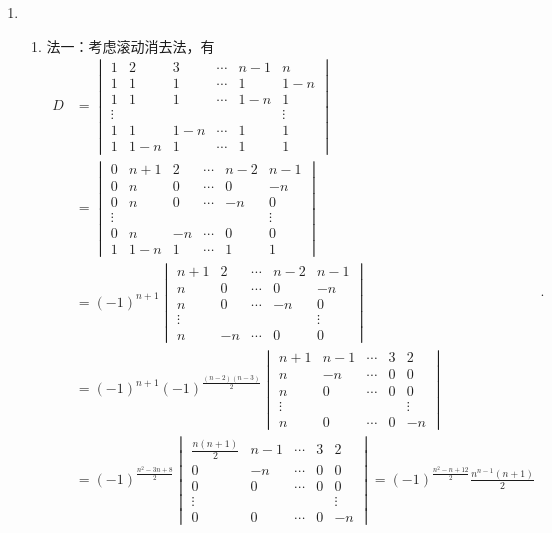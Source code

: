 \begin{enumerate}
\begin{enumerate}
        \item \begin{enumerate}
            \item 法一：考虑滚动消去法，有
            \[\begin{aligned}
            D&=\begin{vmatrix}
            1 & 2 & 3 &\cdots & n-1 & n \\
            1 & 1 & 1 &\cdots & 1 & 1-n \\
            1 & 1 & 1 &\cdots & 1-n & 1 \\
            \vdots & & & & & \vdots \\
            1 & 1 & 1-n &\cdots & 1 & 1\\
            1 & 1-n & 1 &\cdots & 1 & 1
            \end{vmatrix}\\&=\begin{vmatrix}
            0 & n+1 & 2 &\cdots & n-2 & n-1 \\
            0 & n & 0 &\cdots & 0 & -n \\
            0 & n & 0 &\cdots & -n & 0 \\
            \vdots & & & & & \vdots \\
            0 & n & -n &\cdots & 0 & 0\\
            1 & 1-n & 1 &\cdots & 1 & 1
            \end{vmatrix}\\
            &=(-1)^{n+1}\begin{vmatrix}
            n+1 & 2 &\cdots & n-2 & n-1 \\
            n & 0 &\cdots & 0 & -n \\
            n & 0 &\cdots & -n & 0 \\
            \vdots & & & & \vdots \\
            n & -n &\cdots & 0 & 0
            \end{vmatrix}\\
            &=(-1)^{n+1}(-1)^{\frac{(n-2)(n-3)}{2}}
            \begin{vmatrix}
            n+1 & n-1 &\cdots & 3 & 2 \\
            n & -n &\cdots & 0 & 0 \\
            n & 0 &\cdots & 0 & 0 \\
            \vdots & & & & \vdots \\
            n & 0 &\cdots & 0 & -n
            \end{vmatrix}\\
            &=(-1)^{\frac{n^2-3n+8}{2}}\begin{vmatrix}
            \frac{n(n+1)}{2} & n-1 &\cdots & 3 & 2 \\
            0 & -n &\cdots & 0 & 0 \\
            0 & 0 &\cdots & 0 & 0 \\
            \vdots & & & & \vdots \\
            0 & 0 &\cdots & 0 & -n
            \end{vmatrix}=(-1)^{\frac{n^2-n+12}{2}}\frac{n^{n-1}(n+1)}{2}
            \end{aligned}.\]


\end{enumerate}
\end{enumerate}
\end{enumerate}
